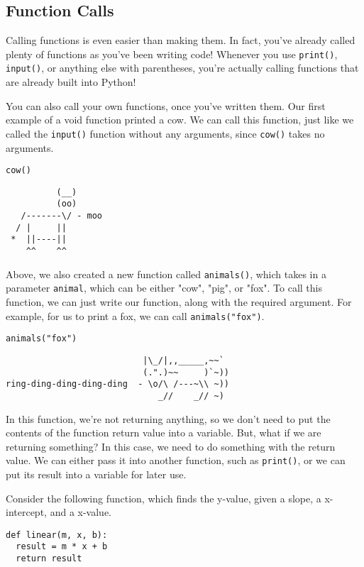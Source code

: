 \subsection{Function Calls}
Calling functions is even easier than making them. In fact, you've already called plenty of functions as you've been writing code! Whenever you use \verb|print()|, \verb|input()|, or anything else with parentheses, you're actually calling functions that are already built into Python!\par
You can also call your own functions, once you've written them. Our first example of a void function printed a cow. We can call this function, just like we called the \verb|input()| function without any arguments, since \verb|cow()| takes no arguments.\par
\begin{lstlisting}[style=pippython]
cow()
\end{lstlisting}
\begin{lstlisting}
          (__)
          (oo)
   /-------\/ - moo
  / |     ||
 *  ||----||
    ^^    ^^
\end{lstlisting}
Above, we also created a new function called \verb|animals()|, which takes in a parameter \verb|animal|, which can be either "cow", "pig", or "fox". To call this function, we can just write our function, along with the required argument. For example, for us to print a fox, we can call \verb|animals("fox")|.
\begin{lstlisting}[style=pippython]
animals("fox")
\end{lstlisting}
\begin{lstlisting}
                           |\_/|,,_____,~~`
                           (.".)~~     )`~))
ring-ding-ding-ding-ding  - \o/\ /---~\\ ~))
                              _//    _// ~)
\end{lstlisting}
In this function, we're not returning anything, so we don't need to put the contents of the function return value into a variable. But, what if we are returning something? In this case, we need to do something with the return value. We can either pass it into another function, such as \verb|print()|, or we can put its result into a variable for later use.\par
Consider the following function, which finds the y-value, given a slope, a x-intercept, and a x-value.\par
\begin{lstlisting}[style=pippython]
def linear(m, x, b):
  result = m * x + b
  return result
\end{lstlisting}
